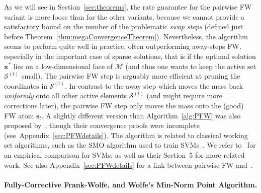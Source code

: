 \documentclass{article} %
\newcommand{\domain}{\mathcal{M}} %
\newcommand{\x}{\bm{x}}
\newcommand{\s}{\bm{s}}
\newcommand{\Coreset}{\mathcal{S}}
\newcommand{\0}{\mathbf{0}} %
\begin{document}
As we will see in Section~\ref{sec:theorems}, the rate guarantee for the
pairwise FW variant is more loose than for the other variants, because we cannot provide a satisfactory bound on the number of the problematic \emph{swap steps} (defined just before Theorem~\ref{thm:megaConvergenceTheorem}).
Nevertheless, the algorithm seems to perform quite well in practice, often
outperforming away-steps FW, especially in the important case of
sparse solutions, that is if the optimal solution
$\x^*$ lies on a low-dimensional face of $\domain$ (and thus one wants to
keep the active set $\Coreset^{(t)}$ small). The pairwise FW step is
arguably more efficient at pruning the coordinates in $\Coreset^{(t)}\!$. In
contrast to the away step which moves the mass back \emph{uniformly} onto
all other active elements $\Coreset^{(t)}$ (and might require more
corrections later), the pairwise FW step only moves the mass onto the (good) FW
atom $\s_t$.
A slightly different version than Algorithm~\ref{alg:PFW} was also proposed
by~\citet{Nanculef:2014bj}, though their convergence proofs were incomplete
(see~Appendix~\ref{sec:PFWdetails}).
%
%
%
%
The algorithm is related to classical working set algorithms, such as
the SMO algorithm used to train SVMs~\citep{Platt:1999wl}. We refer
to~\citep{Nanculef:2014bj} for an empirical comparison for SVMs, as
well as their Section~5 for more related work. See also Appendix~\ref{sec:PFWdetails} 
for a link between pairwise FW and~\citep{Garber:2013vl}.
\vspace{-2mm}

\paragraph{Fully-Corrective Frank-Wolfe, and Wolfe's Min-Norm Point
Algorithm.}
\end{document}
